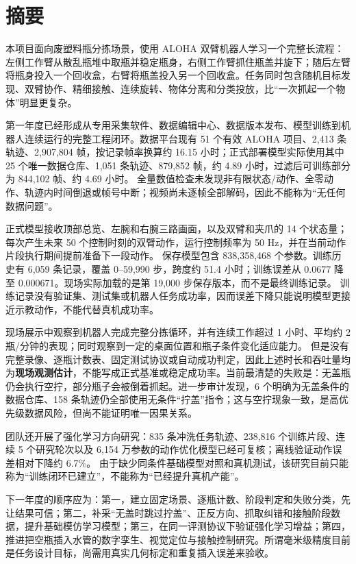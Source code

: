 \chapter*{摘要}

本项目面向废塑料瓶分拣场景，使用 ALOHA 双臂机器人学习一个完整长流程：左侧工作臂从散乱瓶堆中取瓶并稳定瓶身，右侧工作臂抓住瓶盖并旋下；随后左臂将瓶身投入一个回收盒，右臂将瓶盖投入另一个回收盒。任务同时包含随机目标发现、双臂协作、精细接触、连续旋转、物体分离和分类投放，比“一次抓起一个物体”明显更复杂。

第一年度已经形成从专用采集软件、数据编辑中心、数据版本发布、模型训练到机器人连续运行的完整工程闭环。数据平台现有 51 个有效 ALOHA 项目、2,413 条轨迹、2,907,804 帧，按记录帧率换算约 16.15 小时；正式部署模型实际使用其中 25 个唯一数据仓库、1,051 条轨迹、879,852 帧，约 4.89 小时，过滤后可训练部分为 844,102 帧、约 4.69 小时。 全量数值检查未发现非有限状态/动作、全零动作、轨迹内时间倒退或帧号中断；视频尚未逐帧全部解码，因此不能称为“无任何数据问题”。

正式模型接收顶部总览、左腕和右腕三路画面，以及双臂和夹爪的 14 个状态量；每次产生未来 50 个控制时刻的双臂动作，运行控制频率为 50 Hz，并在当前动作片段执行期间提前准备下一段动作。 保存模型包含 838,358,468 个参数。训练历史有 6,059 条记录，覆盖 0--59,990 步，跨度约 51.4 小时；训练误差从 0.0677 降至 0.000671。现场实际加载的是第 19,000 步保存版本，而不是最终训练记录。 训练记录没有验证集、测试集或机器人任务成功率，因而误差下降只能说明模型更接近示教动作，不能代替真机成功率。

现场展示中观察到机器人完成完整分拣循环，并有连续工作超过 1 小时、平均约 2 瓶/分钟的表现；同时观察到一定的桌面位置和瓶子条件变化适应能力。 但是没有完整录像、逐瓶计数表、固定测试协议或自动成功判定，因此上述时长和吞吐量均为\textbf{现场观测估计}，不能写成正式基准或稳定成功率。当前最清楚的失败是：无盖瓶仍会执行空拧，部分瓶子会被倒着抓起。进一步审计发现，6 个明确为无盖条件的数据仓库、158 条轨迹仍全部使用无条件“拧盖”指令；这与空拧现象一致，是高优先级数据风险，但尚不能证明唯一因果关系。

团队还开展了强化学习方向研究：835 条冲洗任务轨迹、238,816 个训练片段、连续 5 个研究轮次以及 6,154 万参数的动作优化模型已经可复核；离线验证动作误差相对下降约 6.7\%。 由于缺少同条件基础模型对照和真机测试，该研究目前只能称为“训练闭环已建立”，不能称为“已经提升真机产能”。

下一年度的顺序应为：第一，建立固定场景、逐瓶计数、阶段判定和失败分类，先让结果可信；第二，补采“无盖时跳过拧盖”、正反方向、抓取纠错和接触阶段数据，提升基础模仿学习模型；第三，在同一评测协议下验证强化学习增益；第四，推进把空瓶插入水管的数字孪生、视觉定位与接触控制研究。所谓毫米级精度目前是任务设计目标，尚需用真实几何标定和重复插入误差来验收。

